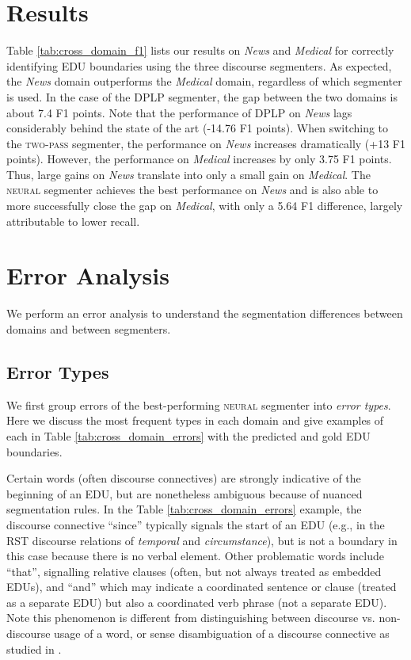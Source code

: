 \section{Results}
Table \ref{tab:cross_domain_f1} lists our results on \textit{News} and \textit{Medical} for correctly identifying EDU boundaries using the three discourse segmenters. As expected, the \textit{News} domain outperforms the \textit{Medical} domain, regardless of which segmenter is used. In the case of the \textsc{DPLP} segmenter, the gap between the two domains is about 7.4 F1 points. Note that the performance of \textsc{DPLP} on \textit{News} lags considerably behind the state of the art (-14.76 F1 points). When switching to the \textsc{two-pass} segmenter, the performance on \textit{News} increases dramatically (+13 F1 points). However, the performance on \textit{Medical} increases by only 3.75 F1 points. Thus, large gains on \textit{News} translate into only a small gain on \textit{Medical}. The \textsc{neural} segmenter achieves the best performance on \textit{News} and is also able to more successfully close the gap on \textit{Medical}, with only a 5.64 F1 difference, largely attributable to lower recall.

\section{Error Analysis}
We perform an error analysis to understand the segmentation differences between domains and between segmenters.

\subsection{Error Types}
\label{sec:error_types}
We first group errors of the best-performing \textsc{neural} segmenter into \emph{error types}. Here we discuss the most frequent types in each domain and give examples of each in Table \ref{tab:cross_domain_errors} with the predicted and gold EDU boundaries.

\medskip
{} Certain words (often discourse connectives) are strongly indicative of the beginning of an EDU, but are nonetheless ambiguous because of nuanced segmentation rules. In the Table \ref{tab:cross_domain_errors} example, the discourse connective ``since'' typically signals the start of an EDU (e.g., in the RST discourse relations of \textit{temporal} and \textit{circumstance}), but is not a boundary in this case because there is no verbal element. Other problematic words include ``that'', signalling relative clauses (often, but not always treated as embedded EDUs), and ``and'' which may indicate a coordinated sentence or clause (treated as a separate EDU) but also a coordinated verb phrase (not a separate EDU). Note this phenomenon is different from distinguishing between discourse vs. non-discourse usage of a word, or sense disambiguation of a discourse connective as studied in \citet{Pitler:2009}.

